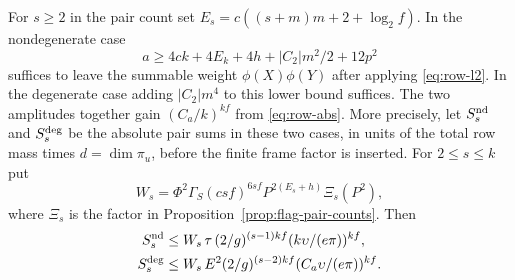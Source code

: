 \begin{proposition}\label{prop:row-higher-corank}
For \(s\ge2\) in the pair count set
\(E_s=c((s+m)m+2+\log_2 f)\). In the nondegenerate case
\[
 a\ge4ck+4E_k+4h+|C_2|m^2/2+12p^2
\]
suffices to leave the summable weight \(\phi(X)\phi(Y)\) after
applying \eqref{eq:row-l2}. In the degenerate case adding
\(|C_2|m^4\) to this lower bound suffices. The two amplitudes
together gain \((C_a/k)^{kf}\) from \eqref{eq:row-abs}.
More precisely, let \(S_s^{\rm nd}\) and \(S_s^{\rm deg}\) be the
absolute pair sums in these two cases, in units of the total row
mass times \(d=\dim\pi_u\), before the finite frame factor is inserted.
For \(2\le s\le k\) put
\[
 W_s=\Phi^2\Gamma_S (csf)^{6sf}P^{2(E_s+h)}\Xi_s(P^2),
\]
where \(\Xi_s\) is the factor in Proposition~\ref{prop:flag-pair-counts}.
Then
\begin{equation}\label{eq:high-corank-summed-prices}
 \begin{aligned}
 S_s^{\rm nd}
 &\le W_s\,\tau\,(2/g)^{(s-1)kf}(k\upsilon/(e\pi))^{kf},\\
 S_s^{\rm deg}
 &\le W_s\,E^2(2/g)^{(s-2)kf}(C_a\upsilon/(e\pi))^{kf}.
 \end{aligned}
\end{equation}
\end{proposition}

